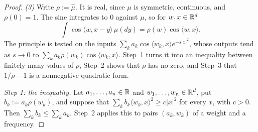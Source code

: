 \begin{proof}
\emph{(3)}
Write $\rho := \widehat\mu$. It is real, since $\mu$ is symmetric, continuous, and $\rho(0) = 1$.
The sine integrates to $0$ against $\mu$, so for $w, x \in \mathbb{R}^d$
\[
  \int\cos\langle w, x - y\rangle\,\mu(dy) = \rho(w)\cos\langle w, x\rangle .
\]
The principle is tested on the inputs $\sum_ka_k\cos\langle w_k, x\rangle e^{-s|x|^2}$, whose
outputs tend as $s \to 0$ to $\sum_ka_k\rho(w_k)\cos\langle w_k, x\rangle$. Step~1 turns it into an
inequality between finitely many values of $\rho$, Step~2 shows that $\rho$ has no zero, and
Step~3 that $1/\rho - 1$ is a nonnegative quadratic form.

\emph{Step 1: the inequality.} Let $a_1, \dots, a_n \in \mathbb{R}$ and $w_1, \dots, w_n \in \mathbb{R}^d$, put
$b_k := a_k\rho(w_k)$, and suppose that $\sum_kb_k\langle w_k, x\rangle^2 \ge c|x|^2$ for every $x$,
with $c > 0$. Then $\sum_kb_k \le \sum_ka_k$. Step~2 applies this to pairs $(a_k, w_k)$ of a
weight and a frequency.


\end{proof}
